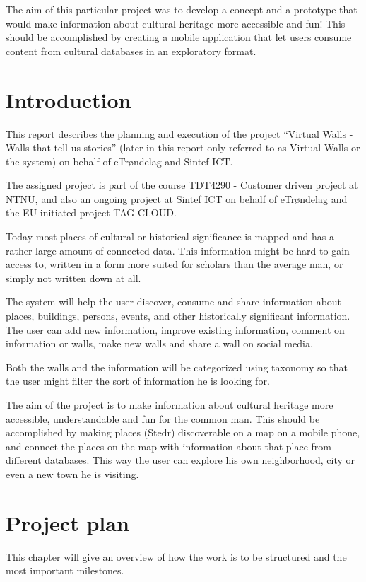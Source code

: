 \documentclass[11pt]{book}
\begin{document}
The aim of this particular project was to develop a concept and a prototype that would make information about cultural heritage more accessible and fun! This should be accomplished by creating a mobile application that let users consume content from cultural databases in an exploratory format.


\tableofcontents
\listoffigures
\listoftables

\mainmatter
\chapter{Introduction}
This report describes the planning and execution of the project ``Virtual Walls - Walls that tell us stories'' (later in this report only referred to as Virtual Walls or the system) on behalf of eTrøndelag and Sintef ICT.

The assigned project is part of the course TDT4290 - Customer driven project at NTNU, and also an ongoing project at Sintef ICT on behalf of eTrøndelag and the EU initiated project TAG-CLOUD.

Today most places of cultural or historical significance is mapped and has a rather large amount of connected data. This information might be hard to gain access to, written in a form more suited for scholars than the average man, or simply not written down at all.

The system will help the user discover, consume and share information about places, buildings, persons, events, and other historically significant information. The user can add new information, improve existing information, comment on information or walls, make new walls and share a wall on social media.

Both the walls and the information will be categorized using taxonomy so that the user might filter the sort of information he is looking for.

The aim of the project is to make information about cultural heritage more accessible, understandable and fun for the common man. This should be accomplished by making places (Stedr) discoverable on a map on a mobile phone, and connect the places on the map with information about that place from different databases. This way the user can explore his own neighborhood, city or even a new town he is visiting.

\chapter{Project plan}
This chapter will give an overview of how the work is to be structured and the most important milestones.
\end{document}

